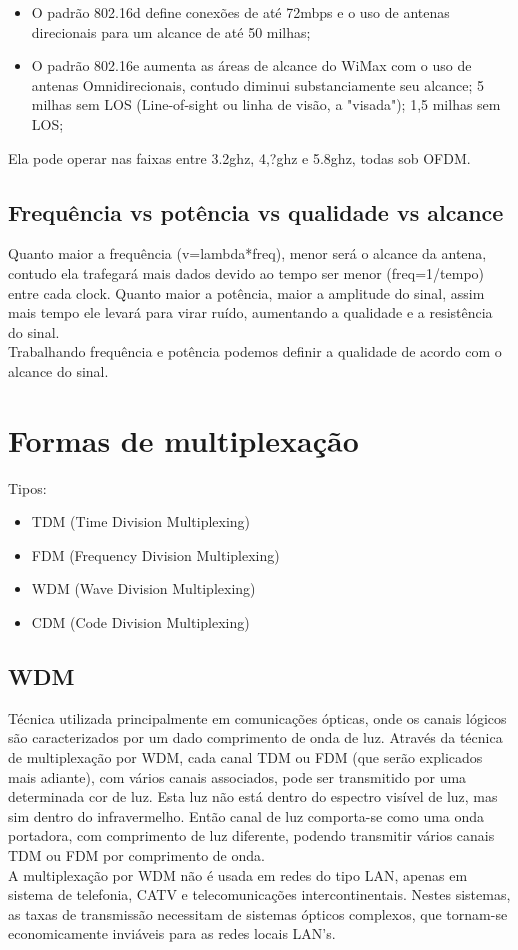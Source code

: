 \documentclass{article}
\begin{document}
\begin{itemize}
	\item O padrão 802.16d define conexões de até 72mbps e o uso de antenas
direcionais para um alcance de até 50 milhas;
	\item O padrão 802.16e aumenta as áreas de alcance do WiMax com o uso de
antenas Omnidirecionais, contudo diminui substanciamente seu alcance; 5 milhas
sem LOS (Line-of-sight ou linha de visão, a "visada"); 1,5 milhas sem LOS;
\end{itemize}

Ela pode operar nas faixas entre 3.2ghz, 4,?ghz e 5.8ghz, todas sob OFDM.

\subsection{Frequência vs potência vs qualidade vs alcance}
Quanto maior a frequência (v=lambda*freq), menor será o alcance da antena,
contudo ela trafegará mais dados devido ao tempo ser menor (freq=1/tempo) entre
cada clock. Quanto maior a potência, maior a amplitude do sinal, assim mais
tempo ele levará para virar ruído, aumentando a qualidade e a resistência do
sinal.\\ Trabalhando frequência e potência podemos definir a qualidade de acordo com o
alcance do sinal.

\section{Formas de multiplexação}

Tipos:

\begin{itemize}
	\item TDM (Time Division Multiplexing)
	\item FDM (Frequency Division Multiplexing)
	\item WDM (Wave Division Multiplexing) 
	\item CDM (Code Division Multiplexing) 
\end{itemize}

\subsection{WDM}
Técnica utilizada principalmente em comunicações ópticas, onde os canais
lógicos são caracterizados por um dado comprimento de onda de luz. Através da
técnica de multiplexação por WDM, cada canal TDM ou FDM (que serão explicados
mais adiante), com vários canais associados, pode ser transmitido por uma
determinada cor de luz. Esta luz não está dentro do espectro visível de luz,
mas sim dentro do infravermelho. Então canal de luz comporta-se como uma onda
portadora, com comprimento de luz diferente, podendo transmitir vários canais
TDM ou FDM por comprimento de onda.\\ A multiplexação por WDM não é usada em
redes do tipo LAN, apenas em sistema de telefonia, CATV e telecomunicações
intercontinentais. Nestes sistemas, as taxas de transmissão necessitam de
sistemas ópticos complexos, que tornam-se  economicamente inviáveis para as
redes locais LAN's.
\end{document}
